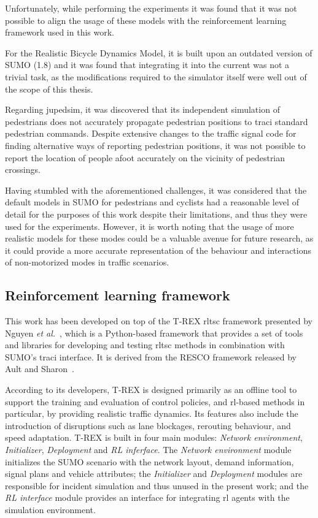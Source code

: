 \medskip

\noindent Unfortunately, while performing the experiments it was found that it was not possible to align the usage of these models with the reinforcement learning framework used in this work.

For the Realistic Bicycle Dynamics Model, it is built upon an outdated version of SUMO (1.8) and it was found that integrating it into the current was not a trivial task, as the modifications required to the simulator itself were well out of the scope of this thesis.

Regarding \gls{jupedsim}, it was discovered that its independent simulation of pedestrians does not accurately propagate pedestrian positions to \gls{traci} standard pedestrian commands. Despite extensive changes to the traffic signal code for finding alternative ways of reporting pedestrian positions, it was not possible to report the location of people afoot accurately on the vicinity of pedestrian crossings.

Having stumbled with the aforementioned challenges, it was considered that the default models in SUMO for pedestrians and cyclists had a reasonable level of detail for the purposes of this work despite their limitations, and thus they were used for the experiments. However, it is worth noting that the usage of more realistic models for these modes could be a valuable avenue for future research, as it could provide a more accurate representation of the behaviour and interactions of non-motorized modes in traffic scenarios.

\subsection{Reinforcement learning framework} \label{subsec:reinforcement_learning_framework}

This work has been developed on top of the T-REX \gls{rltsc} framework presented by Nguyen \textit{et al.}~\cite{Nguyen2025}, which is a Python-based framework that provides a set of tools and libraries for developing and testing \gls{rltsc} methods in combination with SUMO's \gls{traci} interface. It is derived from the RESCO framework released by Ault and Sharon~\cite{Ault2021}.

According to its developers, T-REX is designed primarily as an offline tool to support the training and evaluation of control policies, and \gls{rl}-based methods in particular, by providing realistic traffic dynamics. Its features also include the introduction of disruptions such as lane blockages, rerouting behaviour, and speed adaptation. T-REX is built in four main modules: \textit{Network environment}, \textit{Initializer}, \textit{Deployment} and \textit{RL inferface}. The \textit{Network environment} module initializes the SUMO scenario with the network layout, demand information, signal plans and vehicle attributes; the \textit{Initializer} and \textit{Deployment} modules are responsible for incident simulation and thus unused in the present work; and the \textit{RL interface} module provides an interface for integrating \gls{rl} agents with the simulation environment.

